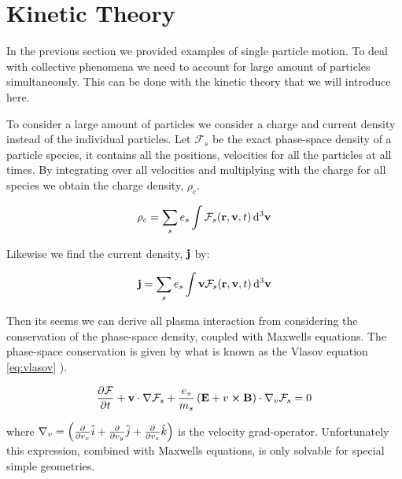 \section{Kinetic Theory}
	In the previous section we provided examples of single particle motion. To deal with collective
	phenomena we need to account for large amount of particles simultaneously.
	This can be done with the kinetic theory that we will introduce here.

	To consider a large amount of particles we consider a charge and current density
	instead of the individual particles.
	Let \(\mathcal{F}_s\) be the exact phase-space density of a particle species,
	it contains all the positions, velocities for all the particles at
	all times. By integrating over all velocities and multiplying with the charge
	for all species we obtain the charge density, \(\rho_c\).

	\[\rho_c = \sum_s e_s \int \mathcal{F}_s(\vb{r},\vb{v},t)\dd[3]{\vb{v}}\]

	Likewise we find the current density, \(\vb{j}\) by:

	\[\vb{j} = \sum_s e_s \int \vb{v}\mathcal{F}_s(\vb{r},\vb{v},t)\dd[3]{\vb{v}}\]

	Then its seems we can derive all plasma interaction from considering
	the conservation of the phase-space density, coupled with Maxwells equations.
	The phase-space conservation is given by what is known as the Vlasov equation \cref{eq:vlasov}
	\citep{pecseli_waves_2012}).

	\begin{align}
		\pdv{\mathcal{F}}{t} + \vb{v}\cdot\nabla\mathcal{F}_s + \frac{e_s}{m_s}\left( \vb{E} + v\cross\vb{B} \right) \cdot \nabla_v\mathcal{F}_s = 0 \label{eq:vlasov}
	\end{align}

	where \(\nabla_v = \left(\pdv{v_x} \hat{i} + \pdv{v_y} \hat{j} + \pdv{v_z} \hat{k}\right)\) is the velocity grad-operator.
	Unfortunately this expression, combined with Maxwells equations, is only solvable
	for special simple geometries.
